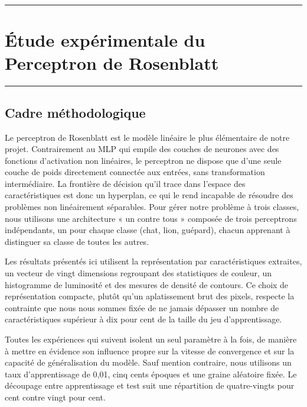 \documentclass[11pt,a4paper]{report}
\begin{document}
\begin{center}\rule{0.5\linewidth}{0.5pt}\end{center}

\hypertarget{uxe9tude-expuxe9rimentale-du-perceptron-de-rosenblatt}{%
\chapter{Étude expérimentale du Perceptron de
Rosenblatt}\label{uxe9tude-expuxe9rimentale-du-perceptron-de-rosenblatt}}

\begin{center}\rule{0.5\linewidth}{0.5pt}\end{center}

\hypertarget{cadre-muxe9thodologique}{%
\section{Cadre méthodologique}\label{cadre-muxe9thodologique}}

Le perceptron de Rosenblatt est le modèle linéaire le plus élémentaire
de notre projet. Contrairement au MLP qui empile des couches de neurones
avec des fonctions d'activation non linéaires, le perceptron ne dispose
que d'une seule couche de poids directement connectée aux entrées, sans
transformation intermédiaire. La frontière de décision qu'il trace dans
l'espace des caractéristiques est donc un hyperplan, ce qui le rend
incapable de résoudre des problèmes non linéairement séparables. Pour
gérer notre problème à trois classes, nous utilisons une architecture «
un contre tous » composée de trois perceptrons indépendants, un pour
chaque classe (chat, lion, guépard), chacun apprenant à distinguer sa
classe de toutes les autres.

Les résultats présentés ici utilisent la représentation par
caractéristiques extraites, un vecteur de vingt dimensions regroupant
des statistiques de couleur, un histogramme de luminosité et des mesures
de densité de contours. Ce choix de représentation compacte, plutôt
qu'un aplatissement brut des pixels, respecte la contrainte que nous
nous sommes fixée de ne jamais dépasser un nombre de caractéristiques
supérieur à dix pour cent de la taille du jeu d'apprentissage.

Toutes les expériences qui suivent isolent un seul paramètre à la fois,
de manière à mettre en évidence son influence propre sur la vitesse de
convergence et sur la capacité de généralisation du modèle. Sauf mention
contraire, nous utilisons un taux d'apprentissage de 0,01, cinq cents
époques et une graine aléatoire fixée. Le découpage entre apprentissage
et test suit une répartition de quatre-vingts pour cent contre vingt
pour cent.
\end{document}
